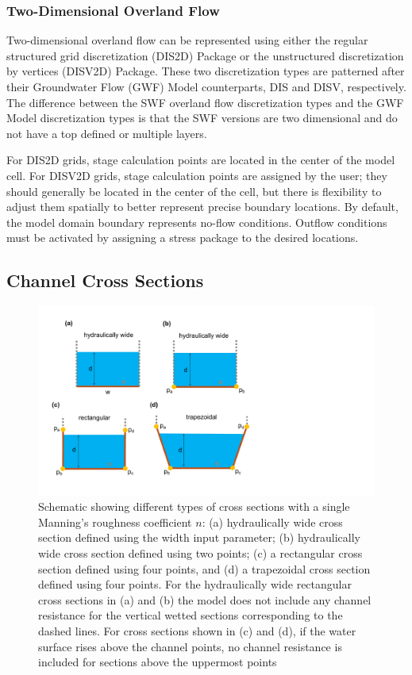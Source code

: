 \documentclass[fleqn]{article}
\begin{document}
\subsubsection{Two-Dimensional Overland Flow}
Two-dimensional overland flow can be represented using either the regular structured grid discretization (DIS2D) Package or the unstructured discretization by vertices (DISV2D) Package.  These two discretization types are patterned after their Groundwater Flow (GWF) Model counterparts, DIS and DISV, respectively.  The difference between the SWF overland flow discretization types and the GWF Model discretization types is that the SWF versions are two dimensional and do not have a top defined or multiple layers.

For DIS2D grids, stage calculation points are located in the center of the model cell.  For DISV2D grids, stage calculation points are assigned by the user; they should generally be located in the center of the cell, but there is flexibility to adjust them spatially to better represent precise boundary locations.  By default, the model domain boundary represents no-flow conditions.  Outflow conditions must be activated by assigning a stress package to the desired locations.

\subsection{Channel Cross Sections}

\begin{figure}[h!tbp]
	\centering
	\includegraphics[scale=0.5]{figures/cxs.pdf}
	\caption[Schematic showing different types of channel cross sections with constant roughness.]{Schematic showing different types of cross sections with a single Manning's roughness coefficient $n$: (a) hydraulically wide cross section defined using the width input parameter; (b) hydraulically wide cross section defined using two points; (c) a rectangular cross section defined using four points, and (d) a trapezoidal cross section defined using four points.  For the hydraulically wide rectangular cross sections in (a) and (b) the model does not include any channel resistance for the vertical wetted sections corresponding to the dashed lines.  For cross sections shown in (c) and (d), if the water surface rises above the channel points, no channel resistance is included for sections above the uppermost points}
	\label{fig:cxs}
\end{figure}
\end{document}
